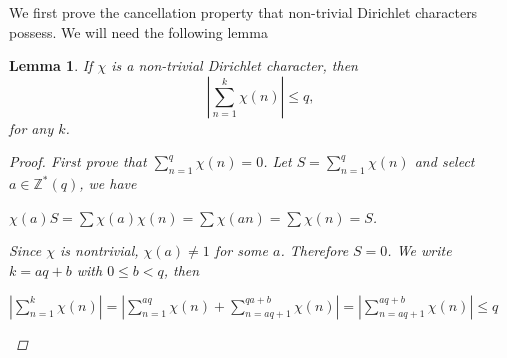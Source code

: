 \documentclass[psamsfonts]{amsart}
\newtheorem{lem}[thm]{Lemma}
\theoremstyle{definition}
\theoremstyle{remark}
\numberwithin{equation}{section}
\begin{document}
			We first prove the cancellation property that non-trivial Dirichlet characters possess. We will need the following lemma
			
			\begin{lem}
				If $\chi$ is a non-trivial Dirichlet character, then
				\begin{equation}
					\left|\sum_{n=1}^{k} \chi(n)\right| \leq q,
				\end{equation}
				for any $k$.
				
				\begin{proof}
					First prove that $\sum_{n=1}^{q} \chi(n) = 0$. Let $S = \sum_{n=1}^{q} \chi(n)$ and select $a \in \mathbb{Z}^*(q)$, we have
					\begin{center}
						$\chi(a)S = \sum \chi(a)\chi(n) = \sum \chi(an) = \sum \chi(n) = S$.
					\end{center}
					Since $\chi$ is nontrivial, $\chi(a) \neq 1$ for some $a$. Therefore $S = 0$. We write $k = aq + b$ with $0 \leq b < q$, then
					\begin{center}
						$|\sum_{n=1}^{k} \chi(n)| = |\sum_{n=1}^{aq}\chi(n) +\sum_{n=aq+1}^{qa+b} \chi(n)| =|\sum_{n=aq+1}^{aq+b} \chi(n)| \leq q$
					\end{center} 
				\end{proof}
			\end{lem}
			
\end{document}
